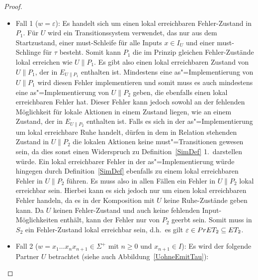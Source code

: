 \begin{proof}
\begin{itemize}
    \item Fall 1 ($w=\varepsilon$): Es handelt sich um einen lokal erreichbaren
      Fehler-Zustand in $P_1$. Für $U$ wird ein Transitionssystem verwendet,
      das nur aus dem Startzustand, einer must-Schleife für alle Inputs $x\in I_U$
      und einer must-Schlinge für $\tau$ besteht. Somit kann $P_1$ die im Prinzip
      gleichen Fehler-Zustände lokal erreichen wie
      $U\|P_1$. Es gibt also einen lokal erreichbaren Zustand von $U\|P_1$, der
      in $E_{U\|P_1}$ enthalten ist. Mindestens eine as"=Implementierung von
      $U\|P_1$ wird diesen Fehler implementieren und somit muss
      es auch mindestens eine as"=Implementierung von $U\|P_2$ geben, die
      ebenfalls einen lokal erreichbaren Fehler hat. Dieser Fehler kann jedoch
      sowohl an der fehlenden Möglichkeit für lokale Aktionen in einem Zustand
      liegen, wie an einem Zustand, der in $E _{U\|P_2}$ enthalten ist. Falls
      es sich in der as"=Implementierung um lokal erreichbare Ruhe handelt,
      dürfen in dem in Relation stehenden Zustand in $U\|P_2$ die lokalen
      Aktionen keine must"=Transitionen gewesen sein, da dies sonst einen
      Widerspruch zu Definition~\ref{SimDef} 1.\ darstellen würde. Ein lokal
      erreichbarer Fehler in der as"=Implementierung würde
      hingegen durch Definition~\ref{SimDef} ebenfalls zu einem lokal
      erreichbaren Fehler in $U\|P_2$ führen. Es muss also in
      allen Fällen ein Fehler in $U\|P_2$ lokal erreichbar sein. Hierbei kann
      es sich jedoch nur um einen lokal erreichbaren Fehler
      handeln, da es in der Komposition mit $U$ keine Ruhe-Zustände geben kann.
      Da $U$ keinen Fehler-Zustand und auch keine fehlenden Input-Möglichkeiten
      enthält, kann der Fehler nur von $P_2$ geerbt sein. Somit
      muss in $S_2$ ein Fehler-Zustand lokal erreichbar sein, d.h.\ es gilt
      $\varepsilon\in PrET _2\subseteq ET _2$.
    \item Fall 2 ($w=x_1\dots x_n x_{n+1}\in\Sigma ^+$ mit $n\geq 0$ und
      $x_{n+1}\in I$): Es wird der folgende Partner $U$ betrachtet (siehe auch
      Abbildung~\ref{UohneEmitTau}):
\end{itemize}
\end{proof}
